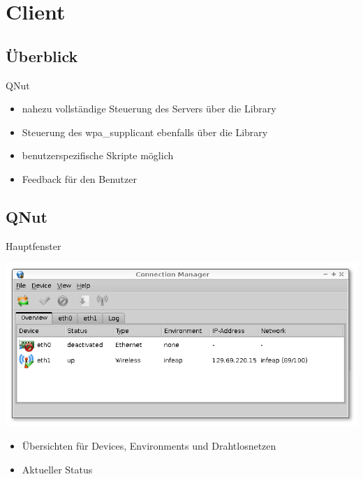 
\section{Client}
\subsection{Überblick}
\begin{frame}[<+-| alert@+>]{QNut}
	\begin{itemize}
		\item nahezu vollständige Steuerung des Servers über die Library
		\item Steuerung des wpa\_supplicant ebenfalls über die Library
		\item benutzerspezifische Skripte möglich
		\item Feedback für den Benutzer
	\end{itemize}
\end{frame}


\subsection{QNut}
\begin{frame}[<+-| alert@+>]{Hauptfenster}

		\includegraphics[scale=0.25]{qnut_overview.png}

	\begin{itemize}
		\item Übersichten für Devices, Environments und Drahtlosnetzen
		\item Aktueller Status
	\end{itemize}
\end{frame}

